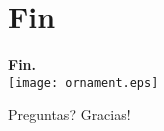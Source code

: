 \documentclass[9pt, handout]{beamer}
\begin{document}
  \section*{Fin}
    \begin{frame}
      \begin{center}
      	\textbf{\calligra\Huge Fin.}\\
        \texttt{[image: ornament.eps]}
        
      	\pause
      	\vspace{1cm}
      	{\huge\calligra Preguntas?\pause{} Gracias!}
      \end{center}
    \end{frame}
      
\end{document}
